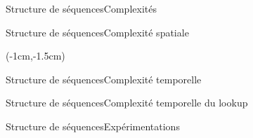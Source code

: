\begin{frame}{Structure de séquences}{Complexités}

  \begin{minipage}{0.32\textwidth}
    \begin{center}
      
    \end{center}
  \end{minipage}
  \begin{minipage}{0.32\textwidth}
    \begin{center}
      
    \end{center}
  \end{minipage}
  \begin{minipage}{0.32\textwidth}
    \begin{center}
      
    \end{center}
  \end{minipage}

\end{frame}

\begin{frame}{Structure de séquences}{Complexité spatiale}
    \begin{textblock*}{\textwidth}(-1cm,-1.5cm) 
      \begin{table}[H]
        
      \end{table}
    \end{textblock*}
\end{frame}


\begin{frame}{Structure de séquences}{Complexité temporelle}

  \begin{center}
    
  \end{center}

\end{frame}

\begin{frame}{Structure de séquences}{Complexité temporelle du lookup}
  
  \begin{center}
    
  \end{center}
  
\end{frame}


\begin{frame}{Structure de séquences}{Expérimentations}
  
\end{frame}

